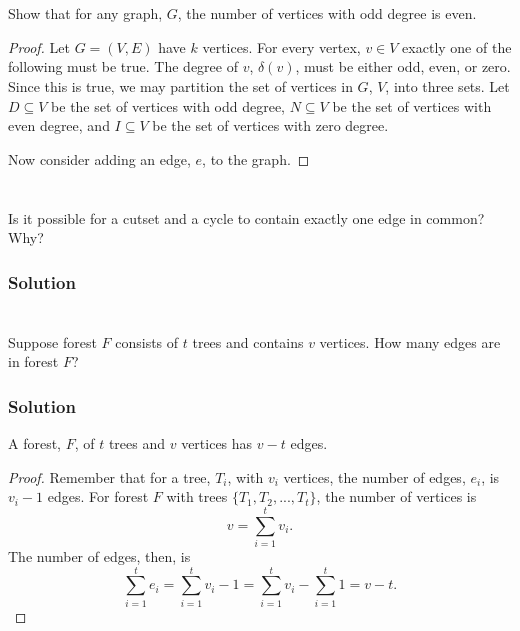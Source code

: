 \documentclass{amsart}
\begin{document}
\section{}
Show that for any graph, $G$, the number of vertices with odd degree is even.
\begin{proof}
  Let $G=(V,E)$ have $k$ vertices. For every vertex, $v\in V$ exactly one of the
  following must be true.
  The degree of $v$, $\delta(v)$, must be either odd, even, or zero.
  Since this is true, we may partition the set of vertices in $G$, $V$, into
  three sets.
  Let $D\subseteq V$ be the set of vertices with odd degree,
  $N\subseteq V$ be the set of vertices with even degree,
  and $I\subseteq V$ be the set of vertices with zero degree.

  Now consider adding an edge, $e$, to the graph.
\end{proof}

\section{}
Is it possible for a cutset and a cycle to contain exactly one edge in common? Why?
\subsubsection*{Solution}

\section{}
Suppose forest $F$ consists of $t$ trees and contains $v$ vertices. How many
edges are in forest $F$?

\subsubsection*{Solution}

A forest, $F$, of $t$ trees and $v$ vertices has $v-t$ edges.
\begin{proof}
  Remember that for a tree, $T_i$, with $v_i$ vertices, the number of edges,
  $e_i$, is $v_i - 1$ edges.
  For forest $F$ with trees $\{T_1, T_2,...,T_t\}$, the number of vertices is
  \begin{equation}
    v = \sum_{i=1}^t v_i.
  \end{equation}
  The number of edges, then, is
  \begin{equation}
    \sum_{i=1}^t e_i = \sum_{i=1}^t v_i -1 = \sum_{i=1}^t v_i - \sum_{i=1}^t  1 = v - t.
  \end{equation}
\end{proof}
\end{document}
